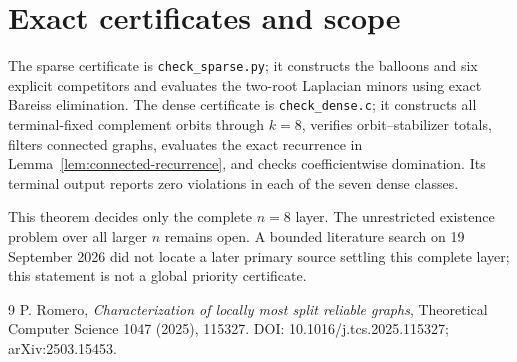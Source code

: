 \documentclass[11pt]{article}
\begin{document}
\section{Exact certificates and scope}
The sparse certificate is \texttt{check\_sparse.py}; it constructs the balloons and six explicit competitors and evaluates the two-root Laplacian minors using exact Bareiss elimination. The dense certificate is \texttt{check\_dense.c}; it constructs all terminal-fixed complement orbits through $k=8$, verifies orbit--stabilizer totals, filters connected graphs, evaluates the exact recurrence in Lemma~\ref{lem:connected-recurrence}, and checks coefficientwise domination. Its terminal output reports zero violations in each of the seven dense classes.

This theorem decides only the complete $n=8$ layer. The unrestricted existence problem over all larger $n$ remains open. A bounded literature search on 19 September 2026 did not locate a later primary source settling this complete layer; this statement is not a global priority certificate.

\begin{thebibliography}{9}
P. Romero,
\emph{Characterization of locally most split reliable graphs},
Theoretical Computer Science 1047 (2025), 115327.
DOI: 10.1016/j.tcs.2025.115327; arXiv:2503.15453.
\end{thebibliography}
\end{document}
